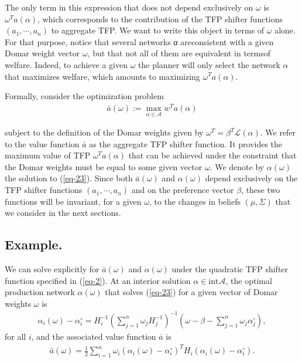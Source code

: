 \documentclass[11pt]{article}
\theoremstyle{definition}
\begin{document}
	The only term in this expression that does not depend exclusively on $\omega$ is $\omega^Ta(\alpha)$, which corresponds to the contribution of the TFP shifter functions $(a_1,\cdots,a_n)$ to aggregate TFP. We want to write this object in terms of $\omega$ alone. For that purpose, notice that several networks α areconsistent with a given Domar weight vector $\omega$, but that not all of them are equivalent in termsof welfare. Indeed, to achieve a given $\omega$ the planner will only select the network $\alpha$ that maximizes welfare, which amounts to maximizing $\omega^Ta(\alpha)$.
	
	Formally, consider the optimization problem
	\begin{align}
		\bar{a}(\omega) := \max\limits_{\alpha\in\mathcal{A}} w^Ta(\alpha) \label{eq-23}
	\end{align}
	
	subject to the definition of the Domar weights given by $\omega^T = \beta^T\mathcal{L}(\alpha)$. We refer to the value function $\bar{a}$ as the aggregate TFP shifter function. It provides the maximum value of TFP $\omega^Ta(\alpha)$ that can be achieved under the constraint that the Domar weights must be equal to some given vector $\omega$. We denote by $\alpha(\omega)$ the solution to (\ref{eq-23}). Since both $\bar{a}(\omega)$ and $\alpha(\omega)$ depend exclusively on the TFP shifter functions $(a_1,\cdots,a_n)$ and on the preference vector $\beta$, these two functions will be invariant, for a given $\omega$, to the changes in beliefs $(\mu, \Sigma)$ that we consider in the next sections.
	
	\subsection*{Example.} 
	We can solve explicitly for $\bar{a}(\omega)$ and $\alpha(\omega)$ under the quadratic TFP shifter function specified in (\ref{eq-2}). At an interior solution $\alpha\in \text{int} \mathcal{A}$, the optimal production network $\alpha(\omega)$ that solves (\ref{eq-23}) for a given vector of Domar weights $\omega$ is
	\begin{align}
		\alpha_i(\omega) - \alpha_i^{\circ} = H_i^{-1} \left(\sum\limits_{j=1}^n \omega_j H_j^{-1}\right)^{-1} \left(\omega - \beta - \sum\limits_{j=1}^n \omega_j \alpha_j^{\circ}\right), \label{eq-24}
	\end{align}
	for all $i$, and the associated value function $\bar{a}$ is
	\begin{align}
		\bar{a}(\omega) = \frac{1}{2}\sum\limits_{i=1}^n\omega_i(\alpha_i(\omega) - \alpha_i^{\circ})^T H_i (\alpha_i(\omega) - \alpha_i^{\circ}). \label{eq-25}
	\end{align}
	
\end{document}
